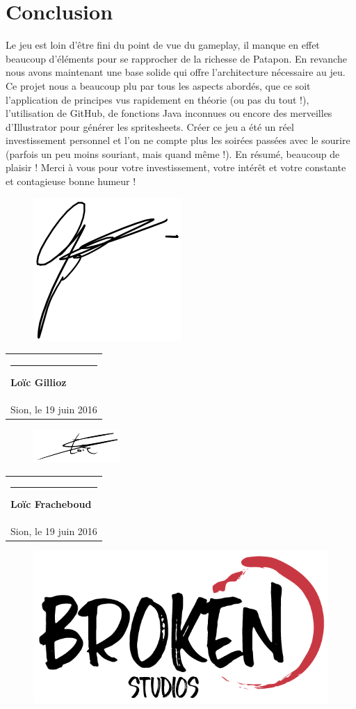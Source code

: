 \documentclass[a4paper,10pt]{article}
\newcommand{\signature}[2]{%
  \par\nobreak\bigskip
  \begin{singlespace}%
  \mbox{}\hfill\begin{tabular}{p{8cm} }
      \rule{8cm}{0.5pt}\newline{}%
        \textbf{#1}\\%
       #2 %
  \end{tabular}%
  \end{singlespace}%
  \medskip%
 }
\begin{document}
 \section{Conclusion}
 Le jeu est loin d'être fini du point de vue du gameplay, il manque en effet beaucoup d'éléments pour se rapprocher de la richesse de Patapon. En revanche nous avons maintenant une base solide qui offre l'architecture nécessaire au jeu.
 \newline Ce projet nous a beaucoup plu par tous les aspects abordés, que ce soit l'application de principes vus rapidement en théorie (ou pas du tout !), l'utilisation de GitHub, de fonctions Java inconnues ou encore des merveilles d'Illustrator pour générer les spritesheets. Créer ce jeu a été un réel investissement personnel et l'on ne compte plus les soirées passées avec le sourire (parfois un peu moins souriant, mais quand même !).
En résumé, beaucoup de plaisir !
Merci à vous pour votre investissement, votre intérêt et votre constante et contagieuse bonne humeur !

 \vspace{30pt}
 \begin{figure}
 \vspace{-52pt}
 \centering
 \includegraphics[scale=0.5]{signgillioz}
 \end{figure}
 \signature{Loïc Gillioz}{Sion, le 19 juin 2016} 
 
 \begin{figure}
 \vspace{-52pt}
 \centering
 \includegraphics[scale=1]{signfracheboud}
 \end{figure}
 \signature{Loïc Fracheboud}{Sion, le 19 juin 2016} 
 
  \begin{figure}[!h]
 \centering
 \vspace{100pt}
 \includegraphics[scale=0.3]{images/Broken-Games}
 \end{figure}
 
 
\end{document}
